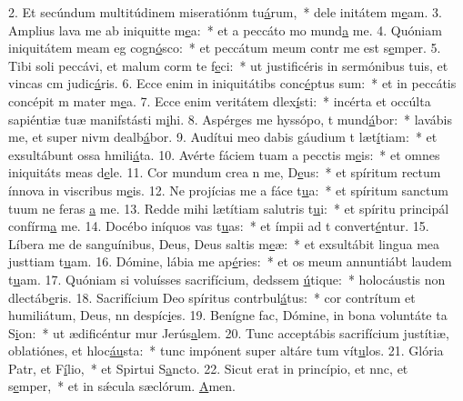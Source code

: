 2. Et secúndum multitúdinem miseratiónm tu\uline{á}rum,~* dele initátem m\uline{e}am.
3. Amplius lava me ab iniquitte m\uline{e}a:~* et a peccáto mo mund\uline{a} me.
4. Quóniam iniquitátem meam eg cogn\uline{ó}sco:~* et peccátum meum contr me est s\uline{e}mper.
5. Tibi soli peccávi, et malum corm te f\uline{e}ci:~* ut justificéris in sermónibus tuis, et vincas cm judic\uline{á}ris.
6. Ecce enim in iniquitátibs conc\uline{é}ptus sum:~* et in peccátis concépit m mater m\uline{e}a.
7. Ecce enim veritátem dlex\uline{í}sti:~* incérta et occúlta sapiéntiæ tuæ manifstásti m\uline{i}hi.
8. Aspérges me hyssópo, t mund\uline{á}bor:~* lavábis me, et super nivm dealb\uline{á}bor.
9. Audítui meo dabis gáudium t læt\uline{í}tiam:~* et exsultábunt ossa hmili\uline{á}ta.
10. Avérte fáciem tuam a pecctis m\uline{e}is:~* et omnes iniquitáts meas d\uline{e}le.
11. Cor mundum crea n me, D\uline{e}us:~* et spíritum rectum ínnova in viscribus m\uline{e}is.
12. Ne projícias me a fáce t\uline{u}a:~* et spíritum sanctum tuum ne feras \uline{a} me.
13. Redde mihi lætítiam salutris t\uline{u}i:~* et spíritu principál confírm\uline{a} me.
14. Docébo iníquos vas t\uline{u}as:~* et ímpii ad t convert\uline{é}ntur.
15. Líbera me de sanguínibus, Deus, Deus saltis m\uline{e}æ:~* et exsultábit lingua mea justtiam t\uline{u}am.
16. Dómine, lábia me ap\uline{é}ries:~* et os meum annuntiábt laudem t\uline{u}am.
17. Quóniam si voluísses sacrifícium, dedssem \uline{ú}tique:~* holocáustis non dlectáb\uline{e}ris.
18. Sacrifícium Deo spíritus contrbul\uline{á}tus:~* cor contrítum et humiliátum, Deus, nn despíc\uline{i}es.
19. Benígne fac, Dómine, in bona voluntáte ta S\uline{i}on:~* ut ædificéntur mur Jerús\uline{a}lem.
20. Tunc acceptábis sacrifícium justítiæ, oblatiónes, et hloc\uline{áu}sta:~* tunc impónent super altáre tum vít\uline{u}los.
21. Glória Patr, et F\uline{í}lio,~* et Spirtui S\uline{a}ncto.
22. Sicut erat in princípio, et nnc, et s\uline{e}mper,~* et in sǽcula sæclórum. \uline{A}men.
